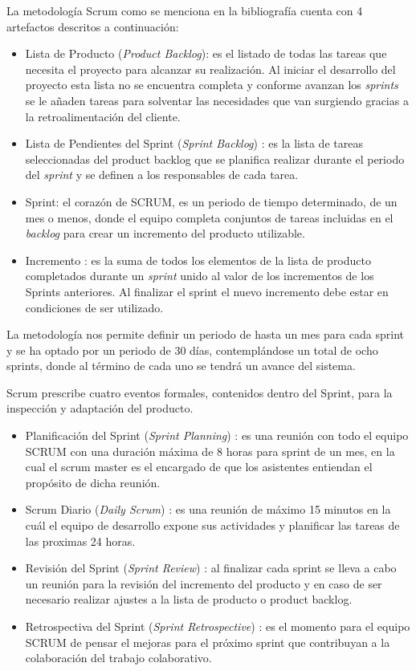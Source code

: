 \noindent La metodología Scrum como se menciona en la bibliografía cuenta con 4 artefactos descritos a continuación:

\begin{itemize}
	\item Lista de Producto (\textit{Product Backlog}):	es el listado de todas las tareas que necesita el proyecto para alcanzar su realización. Al iniciar el desarrollo del
	proyecto esta lista no se encuentra completa y conforme avanzan los \textit{sprints} se le añaden tareas para solventar las necesidades que	van surgiendo gracias a la retroalimentación del cliente.
	\item Lista de Pendientes del Sprint (\textit{Sprint Backlog}) : es la lista de tareas seleccionadas del product backlog que se planifica realizar durante el periodo del \textit{sprint} y se definen a los responsables de cada tarea.
	\item Sprint: el corazón de SCRUM, es un periodo de tiempo determinado, de un mes o menos, donde el equipo completa conjuntos de tareas incluidas en el \textit{backlog} para crear un incremento del producto utilizable.
	\item Incremento : es la suma de todos los elementos de la lista de producto completados durante un \textit{sprint} unido al valor de los incrementos de los Sprints anteriores. Al finalizar el sprint el nuevo incremento debe estar en condiciones de ser utilizado.
\end{itemize}

La metodología nos permite definir un periodo de hasta un mes para cada sprint y se ha optado por un periodo de 30 días, contemplándose un total de ocho sprints, donde al término de cada uno se tendrá un avance del sistema.

\noindent Scrum prescribe cuatro eventos formales, contenidos dentro del Sprint, para la inspección y adaptación del producto.
\begin{itemize}
	\item Planificación del Sprint (\textit{Sprint Planning}) : es una reunión con todo el equipo SCRUM con una duración máxima de 8 horas para sprint de un mes, en la cual el scrum master es el encargado de que los asistentes entiendan el propósito de dicha reunión.
	\item Scrum Diario (\textit{Daily Scrum}) : es una reunión de máximo 15 minutos en la cuál el equipo de desarrollo expone sus actividades y planificar las tareas de las proximas 24 horas.
	\item Revisión del Sprint (\textit{Sprint Review}) : al finalizar cada sprint se lleva a cabo un reunión para la revisión del incremento del producto y en caso de ser necesario realizar ajustes a la lista de producto o product backlog.
	\item Retrospectiva del Sprint (\textit{Sprint Retrospective}) : es el momento para el equipo SCRUM de pensar el mejoras para el próximo sprint que contribuyan a la colaboración del trabajo colaborativo.
\end{itemize}

